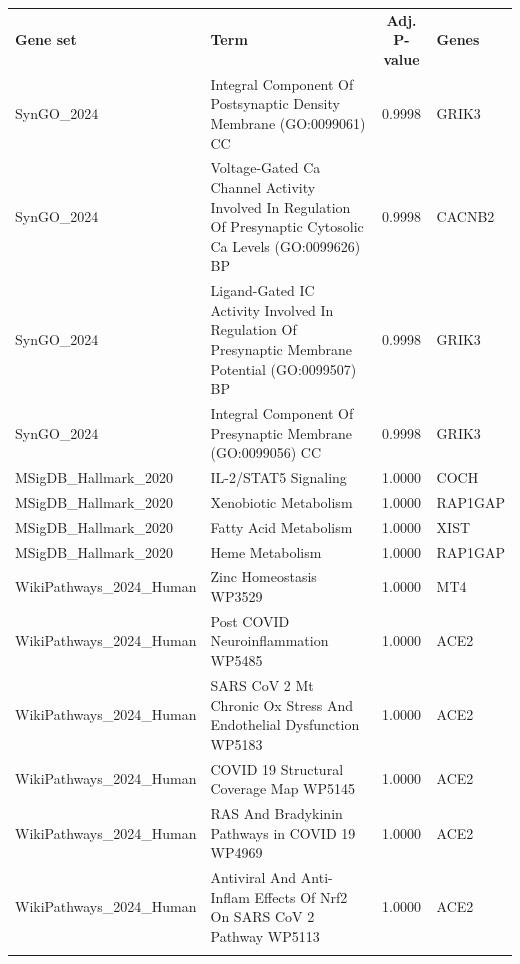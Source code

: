 \documentclass[12pt]{report}
\renewcommand{\arraystretch}{1.5}
\begin{document}
    \begin{table}[htbp]
        \centering
        \scriptsize
        \setlength{\tabcolsep}{4pt}
        \renewcommand{\arraystretch}{1.1}
        \begin{tabular}{@{}>{\raggedright}p{3.2cm}>{\raggedright}p{8cm}S[table-format=1.2]>{\raggedright\arraybackslash}p{1.5cm}@{}}
            \toprule
            \textbf{Gene set} & \textbf{Term} & \textbf{Adj. P-value} & \textbf{Genes} \\ \addlinespace
            \midrule
            SynGO\_2024 & Integral Component Of Postsynaptic Density Membrane (GO:0099061) CC & 0.9998 & GRIK3 \\ \addlinespace
            SynGO\_2024 & Voltage-Gated Ca Channel Activity Involved In Regulation Of Presynaptic Cytosolic Ca Levels (GO:0099626) BP & 0.9998 & CACNB2 \\ \addlinespace
            SynGO\_2024 & Ligand-Gated IC Activity Involved In Regulation Of Presynaptic Membrane Potential (GO:0099507) BP & 0.9998 & GRIK3 \\ \addlinespace
            SynGO\_2024 & Integral Component Of Presynaptic Membrane (GO:0099056) CC & 0.9998 & GRIK3 \\ \addlinespace
            MSigDB\_Hallmark\_2020 & IL-2/STAT5 Signaling & 1.0000 & COCH \\ \addlinespace
            MSigDB\_Hallmark\_2020 & Xenobiotic Metabolism & 1.0000 & RAP1GAP \\ \addlinespace
            MSigDB\_Hallmark\_2020 & Fatty Acid Metabolism & 1.0000 & XIST \\ \addlinespace
            MSigDB\_Hallmark\_2020 & Heme Metabolism & 1.0000 & RAP1GAP \\ \addlinespace
            WikiPathways\_2024\_Human & Zinc Homeostasis WP3529 & 1.0000 & MT4 \\ \addlinespace
            WikiPathways\_2024\_Human & Post COVID Neuroinflammation WP5485 & 1.0000 & ACE2 \\ \addlinespace
            WikiPathways\_2024\_Human & SARS CoV 2 Mt Chronic Ox Stress And Endothelial Dysfunction WP5183 & 1.0000 & ACE2 \\ \addlinespace
            WikiPathways\_2024\_Human & COVID 19 Structural Coverage Map WP5145 & 1.0000 & ACE2 \\ \addlinespace
            WikiPathways\_2024\_Human & RAS And Bradykinin Pathways in COVID 19 WP4969 & 1.0000 & ACE2 \\ \addlinespace
            WikiPathways\_2024\_Human & Antiviral And Anti-Inflam Effects Of Nrf2 On SARS CoV 2 Pathway WP5113 & 1.0000 & ACE2 \\ \addlinespace

\end{tabular}
\end{table}
\end{document}
